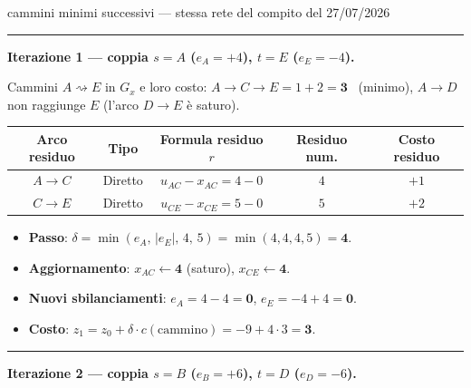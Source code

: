 \documentclass[11pt,a4paper]{article}
\newcommand{\mcfnodes}{%
  \node[nd] (A) at (0,2.1) {$A$};
  \node[nd] (B) at (0,-2.1) {$B$};
  \node[nd] (C) at (3.0,0) {$C$};
  \node[nd] (D) at (6.0,2.1) {$D$};
  \node[nd] (E) at (6.0,-2.1) {$E$};}
\newcommand{\ra}[4]{\draw[#1,thick,black!65] (#2) -- node[font=\scriptsize,black!70,fill=amber!5,inner sep=1pt]{$#4$} (#3);}
\newcommand{\cy}[3]{\draw[->,line width=1.2pt,crimson] (#1) to[bend left=16] node[font=\scriptsize,crimson,fill=amber!5,inner sep=1pt]{$#3$} (#2);}
\begin{document}
\begin{es}{cammini minimi successivi --- stessa rete del compito del 27/07/2026}
\medskip
\hrule
\medskip

\textbf{Iterazione 1 --- coppia $s=A$ ($e_A=+4$), $t=E$ ($e_E=-4$).}

Cammini $A\rightsquigarrow E$ in $G_x$ e loro costo:
$A\!\to\!C\!\to\!E = 1+2 = \mathbf{3}$ \ (minimo), \quad
$A\!\to\!D$ non raggiunge $E$ (l'arco $D\to E$ è saturo).

\begin{center}
\small
\begin{tabular}{@{}ccccc@{}}
\toprule
\textbf{Arco residuo} & \textbf{Tipo} & \textbf{Formula residuo $r$} & \textbf{Residuo num.} & \textbf{Costo residuo}\\
\midrule
$A \to C$ & Diretto & $u_{AC}-x_{AC} = 4-0$ & $4$ & $+1$\\
$C \to E$ & Diretto & $u_{CE}-x_{CE} = 5-0$ & $5$ & $+2$\\
\bottomrule
\end{tabular}
\end{center}
\begin{itemize}[itemsep=0.15em]
\item \textbf{Passo}: $\delta = \min(e_A,\,|e_E|,\,4,\,5) = \min(4,4,4,5) = \mathbf{4}$.
\item \textbf{Aggiornamento}: $x_{AC}\leftarrow \mathbf{4}$ (saturo), \quad $x_{CE}\leftarrow \mathbf{4}$.
\item \textbf{Nuovi sbilanciamenti}: $e_A = 4-4 = \mathbf{0}$, \quad $e_E = -4+4 = \mathbf{0}$.
\item \textbf{Costo}: $z_1 = z_0 + \delta\cdot c(\text{cammino}) = -9 + 4\cdot 3 = \mathbf{3}$.
\end{itemize}

\begin{center}
\par\vspace{1mm}{\scriptsize $G_x$ iniziale: evidenziato il cammino minimo $A\to C\to E$ ($c=3$, $\delta=4$)}
\end{center}

\medskip
\hrule
\medskip

\textbf{Iterazione 2 --- coppia $s=B$ ($e_B=+6$), $t=D$ ($e_D=-6$).}


\end{es}
\end{document}

